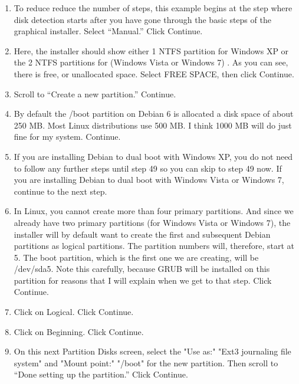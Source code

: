\documentclass[12pt,notitlepage,onecolumn,oneside,openany]{memoir}
\begin{document}
\begin{enumerate}
\item \textsf{To reduce reduce the number of steps, this example begins at the step where disk detection starts after you have gone through the basic steps of the graphical installer. 
Select “Manual.”  Click Continue.}

\item \textsf{Here, the installer should show either 1 NTFS partition for Windows XP or the 2 NTFS partitions for (Windows Vista or Windows 7) . As you can see, there is free, or unallocated space. Select FREE SPACE, then click Continue.}

\item \textsf{Scroll to “Create a new partition.” Continue.} 

\item \textsf{By default the /boot partition on Debian 6 is allocated a disk space of about 250 MB. Most Linux distributions use 500 MB. I think 1000 MB will do just fine for my system. Continue.}

\item \textsf{If you are installing Debian to dual boot with Windows XP, you do not need to follow any further steps until step 49 so you can skip to step 49 now.  If you are installing Debian to dual boot with Windows Vista or Windows 7, continue to the next step.}

\item \textsf{In Linux, you cannot create more than four primary partitions. And since we already have two primary partitions (for Windows Vista or Windows 7), the installer will by default want to create the first and subsequent Debian partitions as logical partitions. The partition numbers will, therefore, start at 5. The boot partition, which is the first one we are creating, will be /dev/sda5. Note this carefully, because GRUB will be installed on this partition for reasons that I will explain when we get to that step. Click Continue.}

\item \textsf{Click on Logical. Click Continue.}

\item \textsf{Click on Beginning. Click Continue.} 

\item \textsf{On this next Partition Disks screen, select the "Use as:" "Ext3 journaling file system" and "Mount point:" "/boot" for the new partition. Then scroll to “Done setting up the partition.” Click Continue.}


\end{enumerate}
\end{document}
